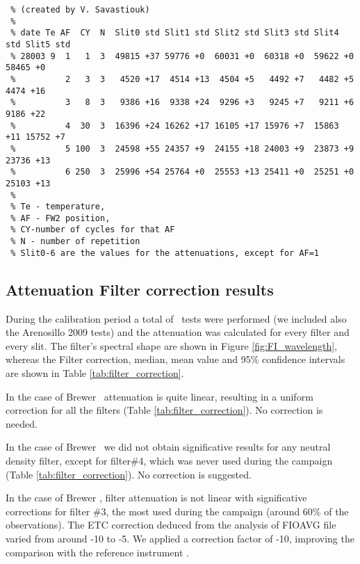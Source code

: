 \vspace{.25cm}
\begin{Verbatim}[frame=lines,fontsize=\footnotesize,fontfamily=courier,fontshape=it,xleftmargin=1cm,xrightmargin=1cm]
 % IOS description of the fi test output in fioavg.\#\#\# file
 % (created by V. Savastiouk)
 %
 % date Te AF  CY  N  Slit0 std Slit1 std Slit2 std Slit3 std Slit4 std Slit5 std
 % 28003 9  1   1  3  49815 +37 59776 +0  60031 +0  60318 +0  59622 +0  58465 +0
 %          2   3  3   4520 +17  4514 +13  4504 +5   4492 +7   4482 +5   4474 +16
 %          3   8  3   9386 +16  9338 +24  9296 +3   9245 +7   9211 +6   9186 +22
 %          4  30  3  16396 +24 16262 +17 16105 +17 15976 +7  15863 +11 15752 +7
 %          5 100  3  24598 +55 24357 +9  24155 +18 24003 +9  23873 +9  23736 +13
 %          6 250  3  25996 +54 25764 +0  25553 +13 25411 +0  25251 +0  25103 +13
 %
 % Te - temperature,
 % AF - FW2 position,
 % CY-number of cycles for that AF
 % N - number of repetition
 % Slit0-6 are the values for the attenuations, except for AF=1
\end{Verbatim}
\clearpage

\subsection{Attenuation Filter correction results} \label{subsec:FIR}
During the calibration period a total of \textbf{\NFI}\ tests were performed (we included also the Arenosillo 2009 tests) and the attenuation was calculated for every filter and every slit. The filter's spectral shape are shown in Figure \ref{fig:FI_wavelength}, whereas the Filter correction, median, mean value and 95\% confidence intervals are shown in Table \ref{tab:filter_correction}.

In the case of Brewer \textbf{\brwname}\ attenuation is quite linear, resulting in a uniform correction for all the filters (Table \ref{tab:filter_correction}). No correction is needed.

In the case of Brewer \textbf{\brwname}\ we did not obtain significative results for any neutral density filter, except for filter\#4, which was never used during the campaign (Table \ref{tab:filter_correction}). No correction is suggested.

In the case of Brewer \textbf{\brwname}, filter attenuation is not linear with significative corrections for filter \#3, the most used during the campaign (around 60\% of the observations). The ETC correction deduced from the analysis of FIOAVG file varied from around -10 to -5. We applied a correction factor of -10, improving the comparison with the reference instrument \brwref.

